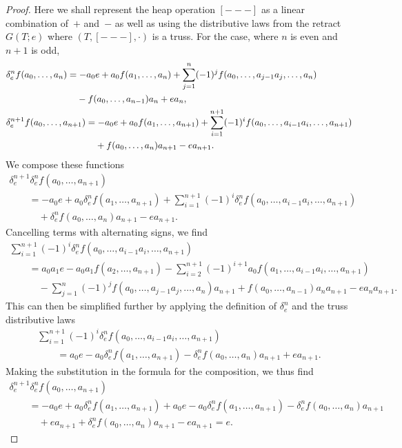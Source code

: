 \documentclass[10pt,a4paper]{amsart}
\numberwithin{equation}{section}
\begin{document}
\begin{proof}
Here we shall represent the heap operation $[---]$ as a linear combination of~$+$ and~$-$ as well as using the distributive laws from the retract $G(T;e)$ where $(T,[---],\cdot)$ is a truss.
For the case, where $n$ is even and $n+1$ is odd,
\begin{align*}
 &\delta^n_e f(a_0,\dots,a_n)= - a_0 e + a_0 f(a_1,\dots,a_n) + \sum^{n}_{j=1}(-1)^j f (a_0,\dots,a_{j-1}a_j,\dots,a_n) \\
 & \hphantom{\delta^n_e f(a_0,\dots,a_n)=}{} -f(a_0,\dots,a_{n-1})a_n+ea_n,\\
 &\delta^{n+1}_e f(a_0,\dots,a_{n+1})= - a_0 e + a_0 f(a_1,\dots,a_{n+1}) + \sum^{n+1}_{i=1}(-1)^i f (a_0,\dots,a_{i-1}a_i,\dots,a_{n+1}) \\
 &\hphantom{\delta^{n+1}_e f(a_0,\dots,a_{n+1})=}{} +f(a_0,\dots,a_{n})a_{n+1}-ea_{n+1}.
\end{align*}
We compose these functions
\begin{gather*}
 \delta^{n+1}_e\delta^{n}_e f(a_0,\dots,a_{n+1})\\
\qquad{} =- a_0 e + a_0 \delta^n_e f (a_1,\dots,a_{n+1})+ \sum_{i=1}^{n+1} (-1)^i \delta^n_e f (a_0,\dots,a_{i-1}a_i,\dots,a_{n+1}) \\
\qquad\quad{} + \delta^n_e f(a_0,\dots,a_n)a_{n+1} - ea_{n+1}.
\end{gather*}
Cancelling terms with alternating signs, we find
\begin{gather*}
   \sum_{i=1}^{n+1} (-1)^i \delta^n_e f (a_0,\dots,a_{i-1}a_i,\dots,a_{n+1}) \\
   \qquad{} = a_0 a_1 e - a_0 a_1 f(a_2,\dots,a_{n+1})
 - \sum_{i=2}^{n+1}(-1)^{i+1}a_0 f(a_1,\dots,a_{i-1}a_i,\dots,a_{n+1}) \\
\qquad\quad{}  - \sum_{j=1}^n (-1)^j f(a_0,\dots,a_{j-1}a_j,\dots,a_n)a_{n+1}  + f (a_0,\dots,a_{n-1})a_n a_{n+1} - ea_n a_{n+1}.
\end{gather*}
This can then be simplified further by applying the definition of $\delta^n_e$ and the truss distributive laws
\begin{gather*}
 \sum_{i=1}^{n+1} (-1)^i \delta^n_e f (a_0,\dots,a_{i-1}a_i,\dots,a_{n+1})\\
 \qquad =  a_0e - a_0\delta^n_e f (a_1,\dots,a_{n+1}) - \delta^n_e f (a_0,\dots,a_{n})a_{n+1} + ea_{n+1}.
\end{gather*}
Making the substitution in the formula for the composition, we thus find
\begin{gather*}
\delta^{n+1}_e\delta^{n}_e f(a_0,\dots,a_{n+1})\\
\qquad {}= - a_0 e
 +a_0\delta^n_e f (a_1,\dots,a_{n+1}) +a_0e - a_0\delta^n_e f (a_1,\dots,a_{n+1})
  - \delta^n_e f (a_0,\dots,a_{n})a_{n+1} \\
  \qquad\quad{} + ea_{n+1} + \delta^n_e f (a_0,\dots,a_{n})a_{n+1}  -ea_{n+1}=e.
\end{gather*}


\end{proof}
\end{document}
